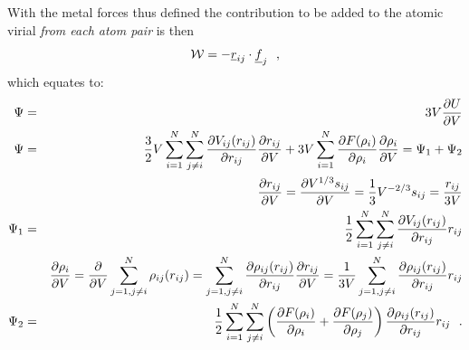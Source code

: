 With the metal forces thus defined the contribution to be added to the
atomic virial {\em from each atom pair} is then
\begin{equation}
{\cal W} = -\mbox{$\underline{r}$}_{ij} \cdot \mbox{$\underline{f}$}_{j}~~,
\end{equation}
which equates to:
\begin{eqnarray}
\Psi &=& 3 V \frac{\partial U}{\partial V} \nonumber \\
\Psi &=& {3 \over 2} V \sum_{i=1}^{N} \sum_{j \ne i}^{N}
\frac{\partial V_{ij}(r_{ij})}{\partial r_{ij}} \frac{\partial r_{ij}}{\partial V} +
3 V \sum_{i=1}^{N} \frac{\partial F(\rho_{i})}{\partial \rho_{i}} \frac{\partial \rho_{i}}{\partial V}
= \Psi_{1} + \Psi_{2} \nonumber \\
& & \frac{\partial r_{ij}}{\partial V} = \frac{\partial V^{1/3}s_{ij}}{\partial V} =
{1 \over 3} V^{-2/3}s_{ij} = \frac{r_{ij}}{3 V} \nonumber \\
\Psi_{1} &=& {1 \over 2} \sum_{i=1}^{N} \sum_{j \ne i}^{N} \frac{\partial V_{ij}(r_{ij})}{\partial r_{ij}} r_{ij} \\
& & \frac{\partial \rho_{i}}{\partial V} = \frac{\partial }{\partial V} \sum_{j=1, j \ne i}^{N} \rho_{ij}(r_{ij}) =
\sum_{j=1, j \ne i}^{N} \frac{\partial \rho_{ij}(r_{ij})}{\partial r_{ij}} \frac{\partial r_{ij}}{\partial V} =
\frac{1}{3 V} \sum_{j=1, j \ne i}^{N} \frac{\partial \rho_{ij}(r_{ij})}{\partial r_{ij}} r_{ij} \nonumber \\
\Psi_{2} &=& {1 \over 2} \sum_{i=1}^{N} \sum_{j \ne i}^{N} \left( \frac{\partial F(\rho_{i})}{\partial \rho_{i}} +
\frac{\partial F(\rho_{j})}{\partial \rho_{j}} \right) \frac{\partial \rho_{ij}(r_{ij})}{\partial r_{ij}} r_{ij}~~. \nonumber
\end{eqnarray}
